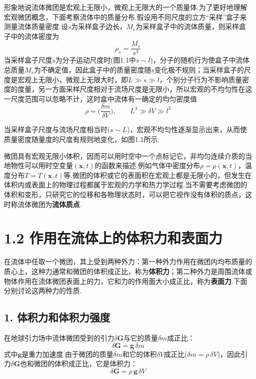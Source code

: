 形象地说流体微团是宏观上无限小，微观上无限大的一个质量体.为了更好地理解宏观微团概念，下面考察流体中的质量分布.假设用不同尺度的立方“采样”盒子来测量流体质量密度.设$s$为采样盒子边长，$M_s$为采样盒子中的流体质量，则采样盒子中的流体密度为
\[
\rho_s=\frac{M_s}{s^{3}}
\]
当采样盒子尺度$s$为分子运动尺度时(图1.1中$s\sim l$)，分子的随机行为使盒子中流体总质量$M_s$为不确定值，因此盒子中的质量密度随$s$变化极不规则；当采样盒子的尺度是宏观上无限小，微观上无限大时，即$L\gg s\gg l$，个别分子行为不影响质量密度的度量，另一方面采样尺度相对于流场尺度是无限小，所以宏观的不均匀性在这一尺度范围可以忽略不计，这时盒中流体有一确定的均匀密度值
\begin{equation*}
\rho=\Big(\frac{\delta m}{\delta V}\Big),\qquad L^{3}\gg \delta V\gg l^{3}
\tag{1.2}
\end{equation*}

当采样盒子尺度与流场尺度相当时($s\sim L$)，宏观不均匀性逐渐显示出来，从而使质量密度随量度的尺度有规则地变化，如图1.1所示.

微团具有宏观无限小体积，因而可以用时空中一个点标记它，非均匀连续介质的当地物性可以用时空变量$(\boldsymbol{x},t)$的函数来描述.例如气体中密度分布$\rho=\rho(\boldsymbol{x},t)$，温度分布$T=T(\boldsymbol{x},t)$等.微团的体积或它的表面积在宏观上都是无限小的，但发生在体积内或表面上的物理过程都属于宏观的力学和热力学过程.当不需要考虑微团的体积和变形，只研究它的位移和各物理状态时，可以把它视作没有体积的质点，这时称流体微团为\textbf{流体质点}.

\section*{1.2  作用在流体上的体积力和表面力}

在流体中任取一个微团，其上受到两种外力：第一种外力作用在微团内均布质量的质心上，这种力通常和微团的体积成正比，称为\textbf{体积力}；第二种外力是周围流体或物体作用在流体微团表面上的力，它和力的作用面大小成正比，称为\textbf{表面力}.下面分别讨论这两种力的性质.

\subsection*{1. 体积力和体积力强度}

在地球引力场中流体微团受到的引力$\delta\boldsymbol{G}$与它的质量$\delta m$成正比：
\begin{equation*}
\delta\boldsymbol{G}=\boldsymbol{g}\,\delta m
\tag{1.3}
\end{equation*}
式中$\boldsymbol{g}$是重力加速度.由于微团的质量$\delta m$和它的体积$\delta V$成正比($\delta m=\rho\,\delta V$)，因此引力$\delta\boldsymbol{G}$也和微团的体积成正比，它是体积力：
\begin{equation*}
\delta\boldsymbol{G}=\rho\,\boldsymbol{g}\,\delta V
\tag{1.4}
\end{equation*}

